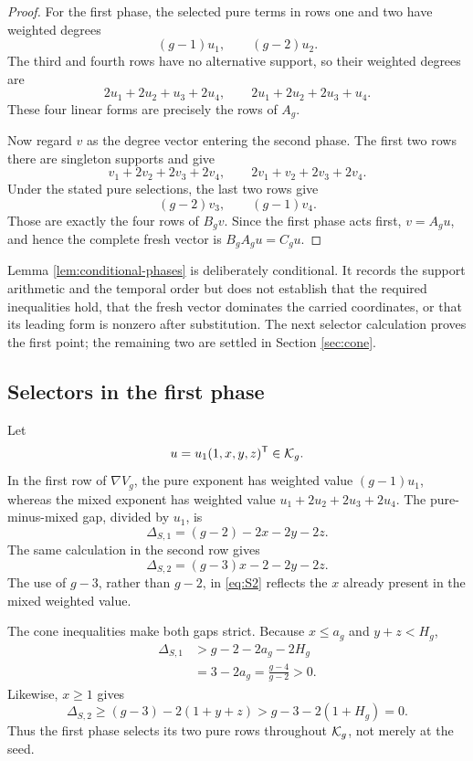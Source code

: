 \documentclass[11pt]{article}
\theoremstyle{remark}
\numberwithin{equation}{section}
\begin{document}
\begin{proof}
For the first phase, the selected pure terms in rows one and two have
weighted degrees
\[
(g-1)u_1,\qquad(g-2)u_2.
\]
The third and fourth rows have no alternative support, so their weighted
degrees are
\[
2u_1+2u_2+u_3+2u_4,\qquad
2u_1+2u_2+2u_3+u_4.
\]
These four linear forms are precisely the rows of \(A_g\).

Now regard \(v\) as the degree vector entering the second phase.  The first
two rows there are singleton supports and give
\[
v_1+2v_2+2v_3+2v_4,\qquad
2v_1+v_2+2v_3+2v_4.
\]
Under the stated pure selections, the last two rows give
\[
(g-2)v_3,\qquad(g-1)v_4.
\]
Those are exactly the four rows of \(B_gv\).  Since the first phase acts
first, \(v=A_gu\), and hence the complete fresh vector is
\(B_gA_gu=C_gu\).
\end{proof}

Lemma \ref{lem:conditional-phases} is deliberately conditional.  It records
the support arithmetic and the temporal order but does not establish that
the required inequalities hold, that the fresh vector dominates the
carried coordinates, or that its leading form is nonzero after
substitution.  The next selector calculation proves the first point; the
remaining two are settled in Section \ref{sec:cone}.

\subsection{Selectors in the first phase}

Let
\[
u=u_1(1,x,y,z)^{\mathsf{T}}\in\mathcal{K}_g.
\]
In the first row of \(\nabla V_g\), the pure exponent has weighted value
\((g-1)u_1\), whereas the mixed exponent has weighted value
\(u_1+2u_2+2u_3+2u_4\).  The pure-minus-mixed gap, divided by \(u_1\), is
\begin{equation}\label{eq:S1}
\Delta_{S,1}=(g-2)-2x-2y-2z.
\end{equation}
The same calculation in the second row gives
\begin{equation}\label{eq:S2}
\Delta_{S,2}=(g-3)x-2-2y-2z.
\end{equation}
The use of \(g-3\), rather than \(g-2\), in
\eqref{eq:S2} reflects the \(x\) already present in the mixed weighted value.

The cone inequalities make both gaps strict.  Because
\(x\leq a_g\) and \(y+z<H_g\),
\begin{equation}\label{eq:S1-bound}
\begin{aligned}
\Delta_{S,1}
&>g-2-2a_g-2H_g\\
&=3-2a_g
=\frac{g-4}{g-2}>0.
\end{aligned}
\end{equation}
Likewise, \(x\geq1\) gives
\begin{equation}\label{eq:S2-bound}
\Delta_{S,2}
\geq(g-3)-2(1+y+z)
>g-3-2(1+H_g)=0.
\end{equation}
Thus the first phase selects its two pure rows throughout \(\mathcal{K}_g\), not
merely at the seed.
\end{document}
